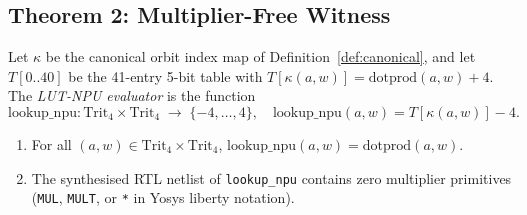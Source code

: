 \subsection{Theorem 2: Multiplier-Free Witness}
\label{subsec:thm_no_star}

\begin{definition}
\label{def:lookup_npu}
Let \(\kappa\) be the canonical orbit index map of
Definition~\ref{def:canonical}, and let \(T[0..40]\) be the 41-entry
5-bit table with \(T[\kappa(a,w)] = \mathrm{dotprod}(a,w) + 4\).
The \emph{LUT-NPU evaluator} is the function
\[
  \mathrm{lookup\_npu} \colon
  \mathrm{Trit}_4 \times \mathrm{Trit}_4 \;\to\; \{-4,\ldots,4\},
  \quad
  \mathrm{lookup\_npu}(a,w) = T[\kappa(a,w)] - 4.
\]
\end{definition}

\begin{theorem}
\label{thm:no_star}
\begin{enumerate}
  \item[(i)] For all \((a,w) \in \mathrm{Trit}_4 \times \mathrm{Trit}_4\),
    \(\mathrm{lookup\_npu}(a,w) = \mathrm{dotprod}(a,w)\).
  \item[(ii)] The synthesised RTL netlist of \texttt{lookup\_npu}
    contains zero multiplier primitives (\texttt{MUL}, \texttt{MULT},
    or \texttt{*} in Yosys liberty notation).
\end{enumerate}
\end{theorem}

